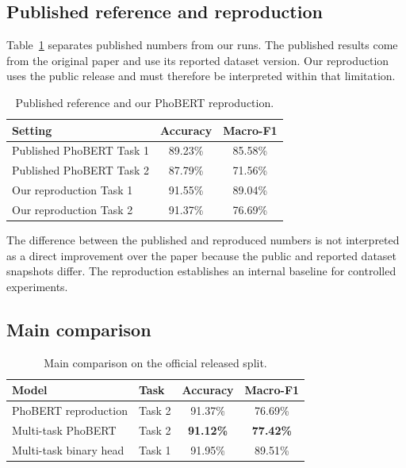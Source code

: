 \documentclass[runningheads]{llncs}
\begin{document}
\subsection{Published reference and reproduction}
Table~\ref{tab:reference} separates published numbers from our runs. The published results come from the original paper and use its reported dataset version. Our reproduction uses the public release and must therefore be interpreted within that limitation.

\begin{table}[t]
\caption{Published reference and our PhoBERT reproduction.}
\label{tab:reference}
\centering
\small
\begin{tabularx}{0.95\linewidth}{Xcc}
\toprule
Setting & Accuracy & Macro-F1 \\
\midrule
Published PhoBERT Task 1 & 89.23\% & 85.58\% \\
Published PhoBERT Task 2 & 87.79\% & 71.56\% \\
Our reproduction Task 1 & 91.55\% & 89.04\% \\
Our reproduction Task 2 & 91.37\% & 76.69\% \\
\bottomrule
\end{tabularx}
\end{table}

The difference between the published and reproduced numbers is not interpreted as a direct improvement over the paper because the public and reported dataset snapshots differ. The reproduction establishes an internal baseline for controlled experiments.

\subsection{Main comparison}
\begin{table}[t]
\caption{Main comparison on the official released split.}
\label{tab:main}
\centering
\small
\begin{tabularx}{0.95\linewidth}{Xlcc}
\toprule
Model & Task & Accuracy & Macro-F1 \\
\midrule
PhoBERT reproduction & Task 2 & 91.37\% & 76.69\% \\
Multi-task PhoBERT & Task 2 & \textbf{91.12\%} & \textbf{77.42\%} \\
\midrule
Multi-task binary head & Task 1 & 91.95\% & 89.51\% \\
\bottomrule
\end{tabularx}
\end{table}
\end{document}
